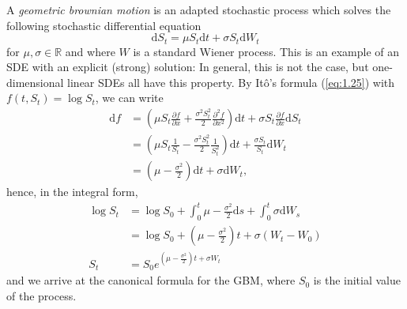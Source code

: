 \begin{definition}
    A \emph{geometric brownian motion} is an adapted stochastic process which solves 
    the following stochastic differential equation
    \begin{equation}
        \mathrm dS_t=\mu S_t\mathrm dt + \sigma S_t\mathrm dW_t
    \end{equation}
    for $\mu,\sigma\in\mathbb{R}$ and where $W$ is a standard Wiener process. This
    is an example of an SDE with an explicit (strong) solution: In general, this 
    is not the case, but one-dimensional linear SDEs all have this property.
    By It\^{o}'s formula (\ref{eq:1.25}) with $f(t,S_t)=\log S_t$, we can write
    \begin{align*}
        \mathrm df&=\left(\mu S_t\frac{\partial f}{\partial x}+\frac{\sigma^2S_t^2}{2}\frac{\partial^2f}{\partial x^2}\right)\mathrm dt +\sigma S_t\frac{\partial f}{\partial x}\mathrm dS_t\\
        &=\left(\mu S_t\frac{1}{S_t}-\frac{\sigma^2S_t^2}{2}\frac{1}{S_t^2}\right)\mathrm dt+\frac{\sigma S_t}{S_t}\mathrm dW_t\\
        &=\left(\mu-\frac{\sigma^2}{2}\right)\mathrm dt+\sigma\mathrm dW_t,
    \end{align*}
    hence, in the integral form,
    \begin{align*}
        \log S_t&=\log S_0+\int_0^t\mu-\frac{\sigma^2}{2}\mathrm ds+\int_0^t\sigma\mathrm dW_s\\
        &=\log S_0+\left(\mu-\frac{\sigma^2}{2}\right)t+\sigma(W_t-W_0)\\
        S_t&=S_0e^{\left(\mu-\frac{\sigma^2}{2}\right)t+\sigma W_t}
    \end{align*}
    and we arrive at the canonical formula for the GBM, where $S_0$ is the initial 
    value of the process.
\end{definition}

